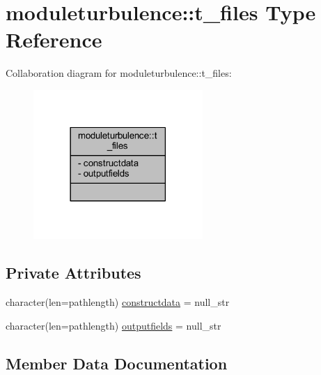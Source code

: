 \hypertarget{structmoduleturbulence_1_1t__files}{}\section{moduleturbulence\+:\+:t\+\_\+files Type Reference}
\label{structmoduleturbulence_1_1t__files}


Collaboration diagram for moduleturbulence\+:\+:t\+\_\+files\+:\nopagebreak
\begin{figure}[H]
\begin{center}
\leavevmode
\includegraphics[width=182pt]{structmoduleturbulence_1_1t__files__coll__graph}
\end{center}
\end{figure}
\subsection*{Private Attributes}
\begin{DoxyCompactItemize}
\item 
character(len=pathlength) \mbox{\hyperlink{structmoduleturbulence_1_1t__files_ae386935711364496fba81bcc649d96f8}{constructdata}} = null\+\_\+str
\item 
character(len=pathlength) \mbox{\hyperlink{structmoduleturbulence_1_1t__files_ad5179e718245343a06e63322c7c1edd6}{outputfields}} = null\+\_\+str
\end{DoxyCompactItemize}


\subsection{Member Data Documentation}
\mbox{\label{structmoduleturbulence_1_1t__files_ae386935711364496fba81bcc649d96f8}} 
